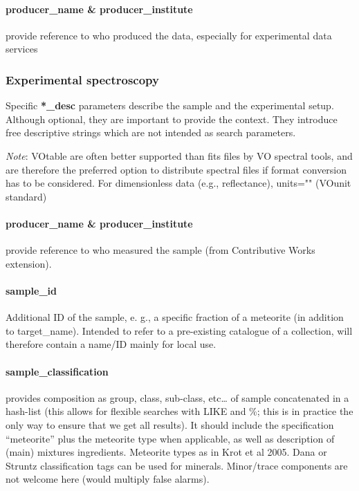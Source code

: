 \documentclass[11pt,a4paper]{ivoa}
\begin{document}
\paragraph{producer\_name \& producer\_institute\\}

provide reference to who produced the data, especially for experimental data services

\subsubsection{Experimental spectroscopy\\}

Specific \textbf{*\_desc} parameters describe the sample and the experimental setup. Although optional, they are important to provide the context. They introduce free descriptive strings which are not intended as search parameters.

\emph{Note}: VOtable are often better supported than fits files by VO spectral tools, and are therefore the preferred option to distribute spectral files if format conversion has to be considered. For dimensionless data (e.g., reflectance), units="" (VOunit standard)

\paragraph{producer\_name \& producer\_institute}

provide reference to who measured the sample (from Contributive Works extension).

\paragraph{sample\_id}

Additional ID of the sample, e. g., a specific fraction of a meteorite (in addition to target\_name). Intended to refer to a pre-existing catalogue of a collection, will therefore contain a name/ID mainly for local use. 

\paragraph{sample\_classification}

provides composition as group, class, sub-class, etc… of sample concatenated in a hash-list (this allows for flexible searches with LIKE and \%; this is in practice the only way to ensure that we get all results). It should include the specification ``meteorite'' plus the meteorite type when applicable, as well as description of (main) mixtures ingredients. Meteorite types as in Krot et al 2005. Dana or Struntz classification tags can be used for minerals. Minor/trace components are not welcome here (would multiply false alarms).
\end{document}
